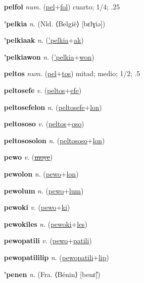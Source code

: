 \textbf{\hypertarget{pelfol}{pelfol}} \textit{num.} (\hyperlink{pel}{pel}+\allowbreak \hyperlink{fol}{fol})
cuarto; 1/4; .25

\textbf{\hypertarget{'pelkia}{'pelkia}} \textit{n.} (Nld. ⟨België⟩ [bɛlɣiə])


\textbf{\hypertarget{'pelkiaak}{'pelkiaak}} \textit{n.} (\hyperlink{'pelkia}{'pelkia}+\allowbreak \hyperlink{ak}{ak})


\textbf{\hypertarget{'pelkiawon}{'pelkiawon}} \textit{n.} (\hyperlink{'pelkia}{'pelkia}+\allowbreak \hyperlink{won}{won})


\textbf{\hypertarget{peltos}{peltos}} \textit{num.} (\hyperlink{pel}{pel}+\allowbreak \hyperlink{tos}{tos})
mitad; medio; 1/2; .5

\textbf{\hypertarget{peltosefe}{peltosefe}} \textit{v.} (\hyperlink{peltos}{peltos}+\allowbreak \hyperlink{efe}{efe})


\textbf{\hypertarget{peltosefelon}{peltosefelon}} \textit{n.} (\hyperlink{peltosefe}{peltosefe}+\allowbreak \hyperlink{lon}{lon})


\textbf{\hypertarget{peltososo}{peltososo}} \textit{v.} (\hyperlink{peltos}{peltos}+\allowbreak \hyperlink{oso}{oso})


\textbf{\hypertarget{peltososolon}{peltososolon}} \textit{n.} (\hyperlink{peltososo}{peltososo}+\allowbreak \hyperlink{lon}{lon})


\textbf{\hypertarget{pewo}{pewo}} \textit{v.} (\hyperlink{moye}{\sout{moye}})


\textbf{\hypertarget{pewolon}{pewolon}} \textit{n.} (\hyperlink{pewo}{pewo}+\allowbreak \hyperlink{lon}{lon})


\textbf{\hypertarget{pewolum}{pewolum}} \textit{n.} (\hyperlink{pewo}{pewo}+\allowbreak \hyperlink{lum}{lum})


\textbf{\hypertarget{pewoki}{pewoki}} \textit{v.} (\hyperlink{pewo}{pewo}+\allowbreak \hyperlink{ki}{ki})


\textbf{\hypertarget{pewokiles}{pewokiles}} \textit{n.} (\hyperlink{pewoki}{pewoki}+\allowbreak \hyperlink{les}{les})


\textbf{\hypertarget{pewopatili}{pewopatili}} \textit{v.} (\hyperlink{pewo}{pewo}+\allowbreak \hyperlink{patili}{patili})


\textbf{\hypertarget{pewopatililip}{pewopatililip}} \textit{n.} (\hyperlink{pewopatili}{pewopatili}+\allowbreak \hyperlink{lip}{lip})


\textbf{\hypertarget{'penen}{'penen}} \textit{n.} (Fra. ⟨Bénin⟩ [benɛ̃])


